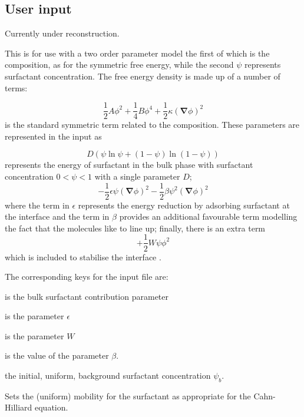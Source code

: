 \subsection{User input}


Currently under reconstruction.

This is for use with a two order parameter model the first of
which is the composition, as for the symmetric free energy,
while the second $\psi$ represents surfactant concentration.
The free energy density is made up of a number of terms:

\begin{equation}
{\textstyle \frac{1}{2}}A\phi^2
+ {\textstyle \frac{1}{4}}B\phi^4
+ {\textstyle \frac{1}{2}}\kappa (\mathbf{\nabla}\phi)^2
\end{equation}
is the standard symmetric term related to the composition.
These parameters are represented in the input as


\begin{equation}
D \left(\psi \ln\psi + (1 - \psi) \ln(1-\psi)\right)
\end{equation}
represents the energy of surfactant in the bulk phase with surfactant
concentration $0 < \psi < 1$ with a single parameter $D$;
\begin{equation}
-{\textstyle \frac{1}{2}} \epsilon \psi (\mathbf{\nabla} \phi)^2
-{\textstyle \frac{1}{2}} \beta \psi^2  (\mathbf{\nabla} \phi)^2
\end{equation}
where the term in $\epsilon$ represents the energy reduction by
adsorbing surfactant at the interface and the term in $\beta$
provides an additional favourable term modelling the fact that
the molecules like to line up; finally, there is an extra term
\begin{equation}
+{\textstyle \frac{1}{2}} W \psi \phi^2
\end{equation}
which is included to stabilise the interface \cite{theissengompper}.

The corresponding keys for the input file are:

 is the bulk surfactant contribution parameter

 is the parameter $\epsilon$

 is the parameter $W$

 is the value of the parameter $\beta$.

 the initial, uniform, background surfactant
concentration $\psi_b$.

 Sets the (uniform) mobility for the surfactant
as appropriate for the Cahn-Hilliard equation.



\vfill
\pagebreak
